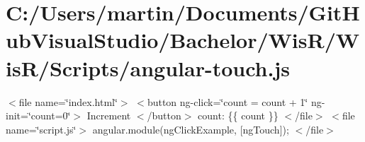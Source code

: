 \hypertarget{_c_1_2_users_2martin_2_documents_2_git_hub_visual_studio_2_bachelor_2_wis_r_2_wis_r_2_scripts_2angular-touch_8js-example}{}\section{C\+:/\+Users/martin/\+Documents/\+Git\+Hub\+Visual\+Studio/\+Bachelor/\+Wis\+R/\+Wis\+R/\+Scripts/angular-\/touch.\+js}
$<$file name=\char`\"{}index.\+html\char`\"{}$>$ $<$button ng-\/click=\char`\"{}count = count + 1\char`\"{} ng-\/init=\char`\"{}count=0\char`\"{}$>$ Increment $<$/button$>$ count\+: \{\{ count \}\} $<$/file$>$ $<$file name=\char`\"{}script.\+js\char`\"{}$>$ angular.\+module(\textquotesingle{}ng\+Click\+Example\textquotesingle{}, \mbox{[}\textquotesingle{}ng\+Touch\textquotesingle{}\mbox{]}); $<$/file$>$ 


